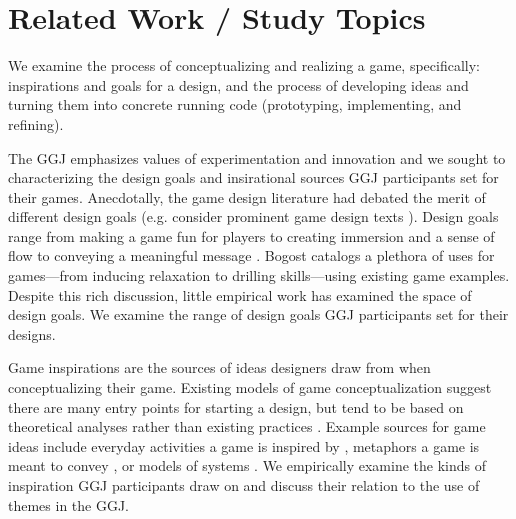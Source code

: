 \documentclass{sig-alternate}
\begin{document}



\section{Related Work / Study Topics}

We examine the process of conceptualizing and realizing a game, specifically: inspirations and goals for a design, and the process of developing ideas and turning them into concrete running code (prototyping, implementing, and refining).

The GGJ emphasizes values of experimentation and innovation and we sought to characterizing the design goals and insirational sources GGJ participants set for their games. Anecdotally, the game design literature had debated the merit of different design goals (e.g. consider prominent game design texts \cite{fullerton2008:playcentric}\cite{salen2003:rulesplay} \cite{salen2006:reader} \cite{schell2008:gamedesign}). Design goals range from making a game fun for players \cite{koster2005:theory-fun} to creating immersion and a sense of flow \cite{fullerton2006:cloudgame} to conveying a meaningful message \cite{bogost2007:persuasive}. Bogost \cite{bogost2011:howto} catalogs a plethora of uses for games---from inducing relaxation to drilling skills---using existing game examples. Despite this rich discussion, little empirical work has examined the space of design goals. We examine the range of design goals GGJ participants set for their designs.

Game inspirations are the sources of ideas designers draw from when conceptualizing their game. Existing models of game conceptualization suggest there are many entry points for starting a design, but tend to be based on theoretical analyses rather than existing practices \cite{hunicke2004:mda}. Example sources for game ideas include everyday activities a game is inspired by \cite{treanor2010:kaboom}, metaphors a game is meant to convey \cite{rusch2008:game-metaphor}, or models of systems \cite{crawford1984:gamedesign}. We empirically examine the kinds of inspiration GGJ participants draw on and discuss their relation to the use of themes in the GGJ.
\end{document}
